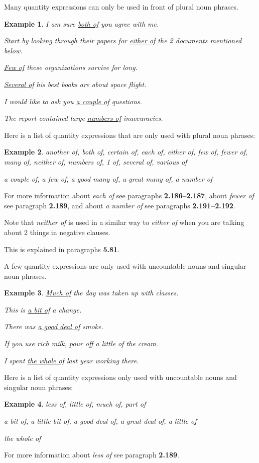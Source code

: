 \documentclass[oneside]{book}
\numberwithin{equation}{section}
\newtheorem{example}{Example}[section]
\begin{document}
%
\noindent{} Many quantity expressions can only be used in front of plural noun phrases.
\begin{example}
    I am sure \underline{both of} you agree with me.
    
    Start by looking through their papers for \underline{either of} the 2 documents mentioned below.
    
    \underline{Few of} these organizations survive for long.
    
    \underline{Several of} his best books are about space flight.
    
    I would like to ask you \underline{a couple of} questions.
    
    The report contained large \underline{numbers of} inaccuracies.
\end{example}
Here is a list of quantity expressions that are only used with plural noun phrases:
\begin{example}
    another of, both of, certain of, each of, either of, few of, fewer of, many of, neither of, numbers of, 1 of, several of, various of
    
    a couple of, a few of, a good many of, a great many of, a number of
\end{example}
For more information about \textit{each of} see paragraphs \textbf{2.186--2.187}, about \textit{fewer of} see paragraph \textbf{2.189}, and about \textit{a number of} see paragraphs \textbf{2.191--2.192}.

%
Note that \textit{neither of} is used in a similar way to \textit{either of} when you are talking about 2 things in negative clauses.

This is explained in paragraphs \textbf{5.81}.

%
\noindent{} A few quantity expressions are only used with uncountable nouns and singular noun phrases.
\begin{example}
    \underline{Much of} the day was taken up with classes.
    
    This is \underline{a bit of} a change.
    
    There was \underline{a good deal of} smoke.
    
    If you use rich milk, pour off \underline{a little of} the cream.
    
    I spent \underline{the whole of} last year working there.
\end{example}
Here is a list of quantity expressions only used with uncountable nouns and singular noun phrases:
\begin{example}
    less of, little of, much of, part of
    
    a bit of, a little bit of, a good deal of, a great deal of, a little of
    
    the whole of
\end{example}
For more information about \textit{less of} see paragraph \textbf{2.189}.
\end{document}
